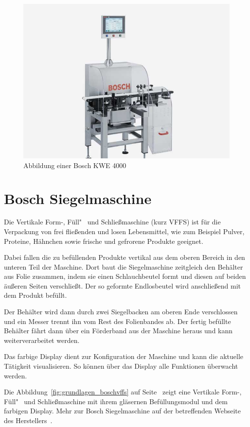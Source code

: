 \begin{figure}[h]
    \centering
    \includegraphics[scale=0.4]{images/kapitel_2/bosch_kwe.jpg}
    \caption{Abbildung einer Bosch KWE 4000}
    \label{fig:grundlagen_boschkwe}
\end{figure}

\section{Bosch Siegelmaschine}
Die Vertikale Form-, Füll"~ und Schließmaschine (kurz VFFS) ist für die Verpackung von  frei fließenden und losen
Lebensmittel, wie zum Beispiel Pulver, Proteine, Hähnchen sowie frische und gefrorene Produkte geeignet.

Dabei fallen die zu befüllenden Produkte vertikal aus dem oberen Bereich in den unteren Teil der Maschine. Dort baut
die Siegelmaschine zeitgleich den Behälter aus Folie zusammen, indem sie einen Schlauchbeutel formt und diesen auf
beiden äußeren Seiten verschließt. Der so geformte Endlosbeutel wird anschließend mit dem Produkt befüllt.

Der Behälter wird dann durch zwei Siegelbacken am oberen Ende verschlossen und ein Messer trennt ihn vom Rest des
Folienbandes ab. Der fertig befüllte Behälter fährt dann über ein Förderband aus der Maschine heraus und kann
weiterverarbeitet werden.

Das farbige Display dient zur Konfiguration der Maschine und kann die aktuelle Tätigkeit visualisieren. So können über
das Display alle Funktionen überwacht werden.

Die Abbildung~\ref{fig:grundlagen_boschvffs} auf Seite~\pageref{fig:grundlagen_boschvffs} zeigt eine Vertikale Form-,
Füll"~ und Schließmaschine mit ihrem gläsernen Befüllungsmodul und dem farbigen Display. Mehr zur Bosch Siegelmaschine
auf der betreffenden Webseite des Herstellers~\cite{online_siegelmaschinen_vffs}.


